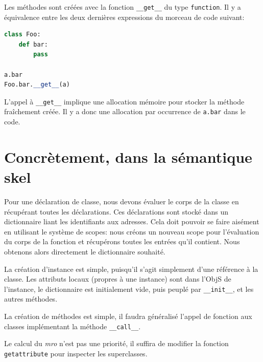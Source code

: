 \documentclass[a4paper, french, 11pt]{article}
\theoremstyle{break}
\begin{document}
Les méthodes sont créées avec la fonction \texttt{\_\_get\_\_} du type \texttt{function}.
Il y a équivalence entre les deux dernières expressions du morceau de code suivant:
\begin{lstlisting}[style=myStyle, language=python]
class Foo:
    def bar:
        pass

a.bar
Foo.bar.__get__(a)
\end{lstlisting}

L'appel à \texttt{\_\_get\_\_} implique une allocation mémoire pour stocker la méthode fraîchement créée.
Il y a donc une allocation par occurrence de \texttt{a.bar} dans le code.


\section{Concrètement, dans la sémantique skel}
Pour une déclaration de classe, nous devons évaluer le corps de la classe en récupérant toutes les déclarations.
Ces déclarations sont stocké dans un dictionnaire liant les identifiants aux adresses.
Cela doit pouvoir se faire aisément en utilisant le système de scopes: nous créons un nouveau scope pour l'évaluation du corps de la fonction et récupérons toutes les entrées qu'il contient.
Nous obtenons alors directement le dictionnaire souhaité.

La création d'instance est simple, puisqu'il s'agit simplement d'une référence à la classe.
Les attributs locaux (propres à une instance) sont dans l'\textsf{ObjS} de l'instance, le dictionnaire est initialement vide, puis peuplé par \texttt{\_\_init\_\_}, et les autres méthodes.

La création de méthodes est simple, il faudra généralisé l'appel de fonction aux classes implémentant la méthode \texttt{\_\_call\_\_}.

Le calcul du \emph{mro} n'est pas une priorité, il suffira de modifier la fonction \texttt{getattribute} pour inspecter les superclasses.
\end{document}
